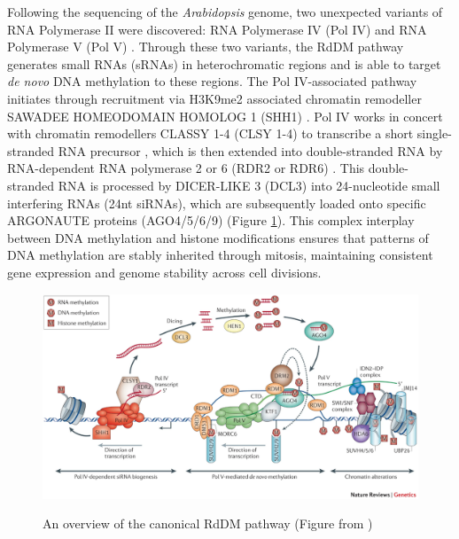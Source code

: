 Following the sequencing of the \textit{Arabidopsis} genome, two unexpected variants of RNA Polymerase II were discovered: RNA Polymerase IV (Pol IV) and RNA Polymerase V (Pol V) \cite{RN115}. Through these two variants, the RdDM pathway generates small RNAs (sRNAs) in heterochromatic regions and is able to target \textit{de novo} DNA methylation to these regions. The Pol IV-associated pathway initiates through recruitment via H3K9me2 associated chromatin remodeller SAWADEE HOMEODOMAIN HOMOLOG 1 (SHH1) \cite{RN206,RN98,RN99,RN116}.  Pol IV works in concert with chromatin remodellers CLASSY 1-4 (CLSY 1-4) to transcribe a short single-stranded RNA precursor \cite{RN117}, which is then extended into double-stranded RNA by RNA-dependent RNA polymerase 2 or 6 (RDR2 or RDR6) \cite{RN61,RN33}. This double-stranded RNA is processed by DICER-LIKE 3 (DCL3) into 24-nucleotide small interfering RNAs (24nt siRNAs), which are subsequently loaded onto specific ARGONAUTE proteins (AGO4/5/6/9) \cite{RN33} (Figure \ref{fig:RdDM_overview}). This complex interplay between DNA methylation and histone modifications ensures that patterns of DNA methylation are stably inherited through mitosis, maintaining consistent gene expression and genome stability across cell divisions.

\begin{figure}[htbp!] 
\centering    
    \includegraphics[width=1\textwidth]{Chapter1/Figs/RdDM.png}
\caption{An overview of the canonical RdDM pathway (Figure from \cite{RN33})}
\label{fig:RdDM_overview}
\captionsetup{font=small}
    \caption*{}
\end{figure}

